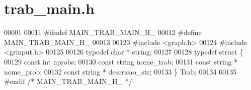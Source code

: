 \section{trab\+\_\+main.\+h}
\label{trab__main_8h_source}

\begin{DoxyCode}
00001 
00011 \textcolor{preprocessor}{#ifndef MAIN\_TRAB\_MAIN\_H\_}
00012 \textcolor{preprocessor}{#define MAIN\_TRAB\_MAIN\_H\_}
00013 
00123 \textcolor{preprocessor}{#include <graph.h>}
00124 \textcolor{preprocessor}{#include <grinput.h>}
00125 
00126 \textcolor{keyword}{typedef} \textcolor{keywordtype}{char} * string;
00127 
00128 \textcolor{keyword}{typedef} \textcolor{keyword}{struct }\{
00129         \textcolor{keyword}{const} \textcolor{keywordtype}{int} nprobs;
00130         \textcolor{keyword}{const} \textcolor{keywordtype}{string} nome\_trab;
00131         \textcolor{keyword}{const} \textcolor{keywordtype}{string} * nome\_prob;
00132         \textcolor{keyword}{const} \textcolor{keywordtype}{string} * descricao\_str;
00133 \} Trab;
00134 
00135 \textcolor{preprocessor}{#endif }\textcolor{comment}{/* MAIN\_TRAB\_MAIN\_H\_ */}\textcolor{preprocessor}{}
\end{DoxyCode}
